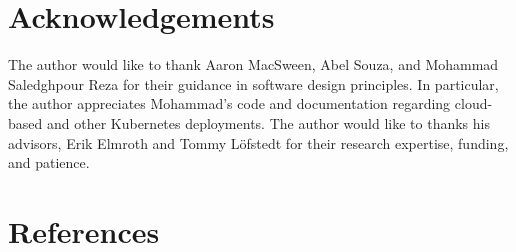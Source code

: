 \documentclass[
]{article}
\begin{document}
\hypertarget{acknowledgements}{%
\section{Acknowledgements}\label{acknowledgements}}

The author would like to thank Aaron MacSween, Abel Souza, and Mohammad
Saledghpour Reza for their guidance in software design principles. In
particular, the author appreciates Mohammad's code and documentation
regarding cloud-based and other Kubernetes deployments. The author would
like to thanks his advisors, Erik Elmroth and Tommy Löfstedt for their
research expertise, funding, and patience.

\hypertarget{references}{%
\section*{References}\label{references}}
\end{document}
